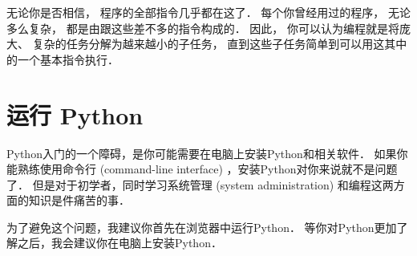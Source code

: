 
无论你是否相信， 程序的全部指令几乎都在这了． 每个你曾经用过的程序， 无论多么复杂， 都是由跟这些差不多的指令构成的． 因此， 你可以认为编程就是将庞大、 复杂的任务分解为越来越小的子任务， 直到这些子任务简单到可以用这其中的一个基本指令执行．

\section{运行 Python}


Python入门的一个障碍，是你可能需要在电脑上安装Python和相关软件．
如果你能熟练使用命令行 (command-line interface) ，安装Python对你来说就不是问题了． 但是对于初学者，同时学习系统管理 (system administration) 和编程这两方面的知识是件痛苦的事．
  
  


为了避免这个问题，我建议你首先在浏览器中运行Python． 等你对Python更加了解之后，我会建议你在电脑上安装Python．



